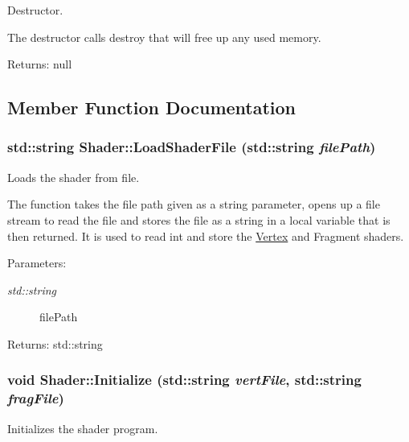Destructor. 

The destructor calls destroy that will free up any used memory.

\begin{Desc}
\item[Returns:]null \end{Desc}


\subsection{Member Function Documentation}
\hypertarget{class_shader_c843ecd8274ea7507df0edf2f4e6a794}{
\subsubsection[LoadShaderFile]{\setlength{\rightskip}{0pt plus 5cm}std::string Shader::LoadShaderFile (std::string {\em filePath})}}
\label{class_shader_c843ecd8274ea7507df0edf2f4e6a794}


Loads the shader from file. 

The function takes the file path given as a string parameter, opens up a file stream to read the file and stores the file as a string in a local variable that is then returned. It is used to read int and store the \hyperlink{struct_vertex}{Vertex} and Fragment shaders.

\begin{Desc}
\item[Parameters:]
\begin{description}
\item[{\em std::string}]filePath \end{description}
\end{Desc}
\begin{Desc}
\item[Returns:]std::string \end{Desc}
\hypertarget{class_shader_10a1c46813a799c87556aa38a96007e7}{
\subsubsection[Initialize]{\setlength{\rightskip}{0pt plus 5cm}void Shader::Initialize (std::string {\em vertFile}, \/  std::string {\em fragFile})}}
\label{class_shader_10a1c46813a799c87556aa38a96007e7}


Initializes the shader program. 

